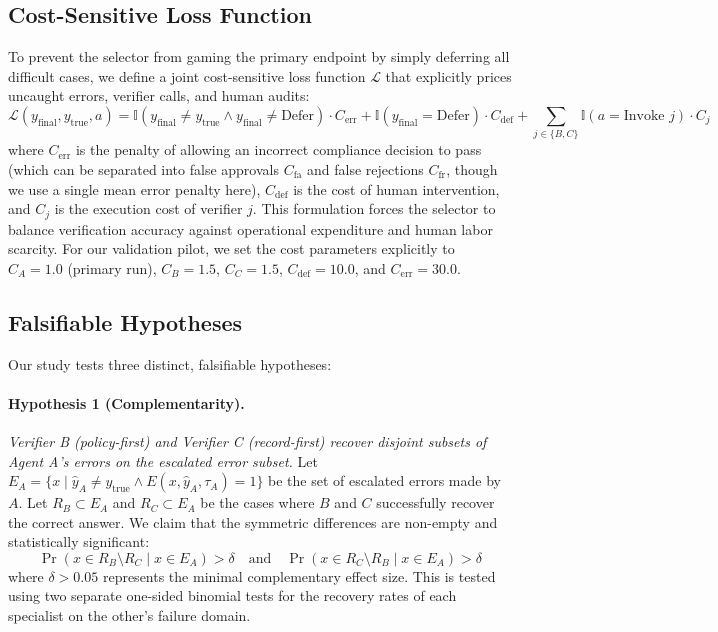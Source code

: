 \documentclass[manuscript,screen,nonacm]{acmart}
\begin{document}
\subsection{Cost-Sensitive Loss Function}
To prevent the selector from gaming the primary endpoint by simply deferring all difficult cases, we define a joint cost-sensitive loss function $\mathcal{L}$ that explicitly prices uncaught errors, verifier calls, and human audits:
\begin{equation}
    \mathcal{L}(y_{\text{final}}, y_{\text{true}}, a) = \mathbb{I}(y_{\text{final}} \neq y_{\text{true}} \land y_{\text{final}} \neq \text{Defer}) \cdot C_{\text{err}} + \mathbb{I}(y_{\text{final}} = \text{Defer}) \cdot C_{\text{def}} + \sum_{j \in \{B, C\}} \mathbb{I}(a = \text{Invoke } j) \cdot C_j
\end{equation}
where $C_{\text{err}}$ is the penalty of allowing an incorrect compliance decision to pass (which can be separated into false approvals $C_{\text{fa}}$ and false rejections $C_{\text{fr}}$, though we use a single mean error penalty here), $C_{\text{def}}$ is the cost of human intervention, and $C_j$ is the execution cost of verifier $j$. This formulation forces the selector to balance verification accuracy against operational expenditure and human labor scarcity. For our validation pilot, we set the cost parameters explicitly to $C_A = 1.0$ (primary run), $C_B = 1.5$, $C_C = 1.5$, $C_{\text{def}} = 10.0$, and $C_{\text{err}} = 30.0$.

\subsection{Falsifiable Hypotheses}
Our study tests three distinct, falsifiable hypotheses:

\paragraph{Hypothesis 1 (Complementarity).}
\emph{Verifier B (policy-first) and Verifier C (record-first) recover disjoint subsets of Agent A's errors on the escalated error subset.}
Let $E_A = \{x \mid \hat{y}_A \neq y_{\text{true}} \land E(x, \hat{y}_A, \tau_A) = 1\}$ be the set of escalated errors made by $A$. Let $R_B \subset E_A$ and $R_C \subset E_A$ be the cases where $B$ and $C$ successfully recover the correct answer. We claim that the symmetric differences are non-empty and statistically significant:
\begin{equation}
    \Pr(x \in R_B \setminus R_C \mid x \in E_A) > \delta \quad \text{and} \quad \Pr(x \in R_C \setminus R_B \mid x \in E_A) > \delta
\end{equation}
where $\delta > 0.05$ represents the minimal complementary effect size. This is tested using two separate one-sided binomial tests for the recovery rates of each specialist on the other's failure domain.
\end{document}
